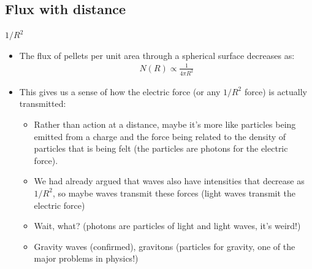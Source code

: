 \documentclass[aspectratio=169,
hyperref={colorlinks,urlcolor=blue}
]{beamer}
\begin{document}
\subsection{Flux with distance}
\label{subsec:fluxwithdistance}
\begin{frame}{$1/R^2$}
\begin{itemize}
  \item The flux of pellets per unit area through a spherical surface decreases as:
  \begin{align*}
  N(R)\propto \frac{1}{4\pi R^2}
  \end{align*}
  \item This gives us a sense of how the electric force (or any $1/R^2$ force) is actually transmitted:
  \begin{itemize}
    \item Rather than action at a distance, maybe it’s more like particles being emitted from a charge and the force being related to the density of particles that is being felt (the particles are photons for the electric force).
  \item We had already argued that waves also have intensities that decrease as $1/R^2$, so maybe waves transmit these forces (light waves transmit the electric force)
  \item Wait, what? (photons are particles of light and light waves, it’s weird!)
  \item[$\rightarrow$] Gravity waves (confirmed), gravitons (particles for gravity, one of the major problems in physics!)

  \end{itemize} 

\end{itemize} 
\end{frame}

\end{document}
